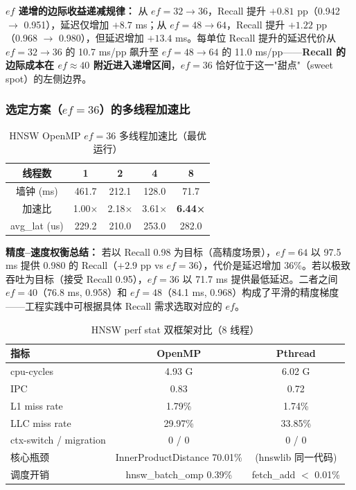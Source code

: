 \documentclass[UTF8,a4paper,10pt]{ctexart}
\begin{document}
\textbf{$ef$ 递增的边际收益递减规律：} 从 $ef=32 \to 36$，Recall 提升 $+0.81$ pp（0.942 $\to$ 0.951），延迟仅增加 $+8.7$ ms；从 $ef=48 \to 64$，Recall 提升 $+1.22$ pp（0.968 $\to$ 0.980），但延迟增加 $+13.4$ ms。每单位 Recall 提升的延迟代价从 $ef=32\to36$ 的 10.7 ms/pp 飙升至 $ef=48\to64$ 的 11.0 ms/pp——\textbf{Recall 的边际成本在 $ef \approx 40$ 附近进入递增区间}，$ef=36$ 恰好位于这一"甜点"（sweet spot）的左侧边界。

\subsubsection{选定方案（$ef=36$）的多线程加速比}

\begin{table}[H]
\centering
\caption{HNSW OpenMP $ef=36$ 多线程加速比（最优运行）}
\begin{tabular}{ccccc}
\hline
线程数 & 1 & 2 & 4 & 8 \\
\hline
墙钟 (ms) & 461.7 & 212.1 & 128.0 & 71.7 \\
加速比 & 1.00× & 2.18× & 3.61× & \textbf{6.44×} \\
avg\_lat (us) & 229.2 & 210.0 & 253.0 & 282.0 \\
\hline
\end{tabular}
\end{table}

\textbf{精度--速度权衡总结：} 若以 Recall 0.98 为目标（高精度场景），$ef=64$ 以 97.5 ms 提供 0.980 的 Recall（$+2.9$ pp vs $ef=36$），代价是延迟增加 36\%。若以极致吞吐为目标（接受 Recall 0.95），$ef=36$ 以 71.7 ms 提供最低延迟。二者之间 $ef=40$（76.8 ms, 0.958）和 $ef=48$（84.1 ms, 0.968）构成了平滑的精度梯度——工程实践中可根据具体 Recall 需求选取对应的 $ef$。

\begin{table}[H]
\centering
\caption{HNSW perf stat 双框架对比（8 线程）}
\begin{tabular}{lcc}
\hline
指标 & OpenMP & Pthread \\
\hline
cpu-cycles & 4.93 G & 6.02 G \\
IPC & 0.83 & 0.72 \\
L1 miss rate & 1.79\% & 1.74\% \\
LLC miss rate & 29.97\% & 33.85\% \\
ctx-switch / migration & 0 / 0 & 0 / 0 \\
核心瓶颈 & InnerProductDistance 70.01\% & (hnswlib 同一代码) \\
调度开销 & hnsw\_batch\_omp 0.39\% & fetch\_add $<$ 0.01\% \\
\hline
\end{tabular}
\end{table}
\end{document}
